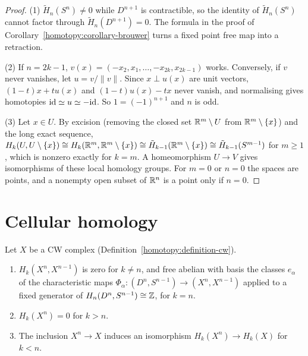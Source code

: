 \begin{proof}
(1) $\tilde{H}_n(S^n) \neq 0$ while $D^{n+1}$ is contractible, so the identity of $\tilde{H}_n(S^n)$ cannot factor through $\tilde{H}_n(D^{n+1}) = 0$. The formula in the proof
of Corollary~\ref{homotopy:corollary-brouwer} turns a fixed point free map into a retraction.

(2) If $n = 2k - 1$, $v(x) = (-x_2, x_1, \ldots, -x_{2k}, x_{2k-1})$ works. Conversely, if $v$ never vanishes, let $u = v/\|v\|$. Since $x \perp u(x)$ are unit vectors,
$(1 - t)x + tu(x)$ and $(1 - t)u(x) - tx$ never vanish, and normalising gives homotopies $\mathrm{id} \simeq u \simeq -\mathrm{id}$. So $1 = (-1)^{n+1}$ and $n$ is odd.

(3) Let $x \in U$. By excision (removing the closed set $\mathbb{R}^m \setminus U$ from $\mathbb{R}^m \setminus \{x\}$) and the long exact sequence,
$H_k(U, U \setminus \{x\}) \cong H_k(\mathbb{R}^m, \mathbb{R}^m \setminus \{x\}) \cong \tilde{H}_{k-1}(\mathbb{R}^m \setminus \{x\}) \cong \tilde{H}_{k-1}(S^{m-1})$ for $m \geq 1$, which is nonzero exactly
for $k = m$. A homeomorphism $U \to V$ gives isomorphisms of these local homology groups. For $m = 0$ or $n = 0$ the spaces are points, and a nonempty open subset of
$\mathbb{R}^n$ is a point only if $n = 0$.
\end{proof}

\section{Cellular homology}\label{singular-homology:section-cellular}

\begin{lemma}\label{singular-homology:lemma-cw-homology}
Let $X$ be a CW complex (Definition~\ref{homotopy:definition-cw}).
\begin{enumerate}
\item $H_k(X^n, X^{n-1})$ is zero for $k \neq n$, and free abelian with basis the classes $e_\alpha$ of the characteristic maps $\Phi_\alpha \colon (D^n, S^{n-1}) \to (X^n, X^{n-1})$
applied to a fixed generator of $H_n(D^n, S^{n-1}) \cong \mathbb{Z}$, for $k = n$.
\item $H_k(X^n) = 0$ for $k > n$.
\item The inclusion $X^n \to X$ induces an isomorphism $H_k(X^n) \to H_k(X)$ for $k < n$.
\end{enumerate}
\end{lemma}

